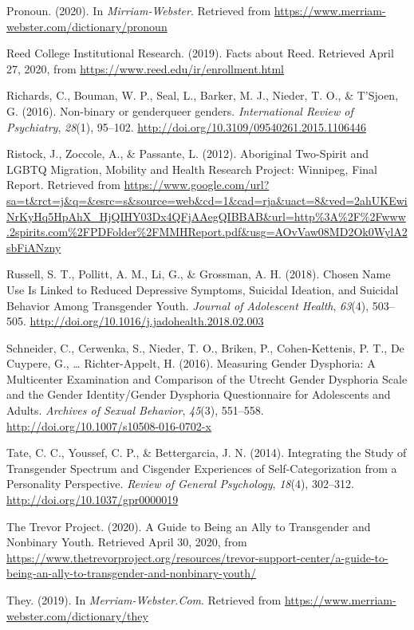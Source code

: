\documentclass[12pt,twoside]{reedthesis}
\newlength{\cslhangindent}
\newenvironment{cslreferences}%
  {\setlength{\parindent}{0pt}%
  \everypar{\setlength{\hangindent}{\cslhangindent}}\ignorespaces}%
  {\par}
\begin{document}
\begin{cslreferences}
\leavevmode\hypertarget{ref-Pronoun2020}{}%
Pronoun. (2020). In \emph{Mirriam-Webster}. Retrieved from \url{https://www.merriam-webster.com/dictionary/pronoun}

\leavevmode\hypertarget{ref-reedcollegeinstitutionalresearchFactsReed2019}{}%
Reed College Institutional Research. (2019). Facts about Reed. Retrieved April 27, 2020, from \url{https://www.reed.edu/ir/enrollment.html}

\leavevmode\hypertarget{ref-richardsNonbinaryGenderqueerGenders2016}{}%
Richards, C., Bouman, W. P., Seal, L., Barker, M. J., Nieder, T. O., \& T'Sjoen, G. (2016). Non-binary or genderqueer genders. \emph{International Review of Psychiatry}, \emph{28}(1), 95--102. \url{http://doi.org/10.3109/09540261.2015.1106446}

\leavevmode\hypertarget{ref-ristockAboriginalTwoSpiritLGBTQ2012}{}%
Ristock, J., Zoccole, A., \& Passante, L. (2012). Aboriginal Two-Spirit and LGBTQ Migration, Mobility and Health Research Project: Winnipeg, Final Report. Retrieved from \url{https://www.google.com/url?sa=t\&rct=j\&q=\&esrc=s\&source=web\&cd=1\&cad=rja\&uact=8\&ved=2ahUKEwiNrKyHq5HpAhX_HjQIHY03Dx4QFjAAegQIBBAB\&url=http\%3A\%2F\%2Fwww.2spirits.com\%2FPDFolder\%2FMMHReport.pdf\&usg=AOvVaw08MD2Ok0WylA2sbFiANzny}

\leavevmode\hypertarget{ref-russellChosenNameUse2018}{}%
Russell, S. T., Pollitt, A. M., Li, G., \& Grossman, A. H. (2018). Chosen Name Use Is Linked to Reduced Depressive Symptoms, Suicidal Ideation, and Suicidal Behavior Among Transgender Youth. \emph{Journal of Adolescent Health}, \emph{63}(4), 503--505. \url{http://doi.org/10.1016/j.jadohealth.2018.02.003}

\leavevmode\hypertarget{ref-schneiderMeasuringGenderDysphoria2016}{}%
Schneider, C., Cerwenka, S., Nieder, T. O., Briken, P., Cohen-Kettenis, P. T., De Cuypere, G., \ldots{} Richter-Appelt, H. (2016). Measuring Gender Dysphoria: A Multicenter Examination and Comparison of the Utrecht Gender Dysphoria Scale and the Gender Identity/Gender Dysphoria Questionnaire for Adolescents and Adults. \emph{Archives of Sexual Behavior}, \emph{45}(3), 551--558. \url{http://doi.org/10.1007/s10508-016-0702-x}

\leavevmode\hypertarget{ref-tateIntegratingStudyTransgender2014}{}%
Tate, C. C., Youssef, C. P., \& Bettergarcia, J. N. (2014). Integrating the Study of Transgender Spectrum and Cisgender Experiences of Self-Categorization from a Personality Perspective. \emph{Review of General Psychology}, \emph{18}(4), 302--312. \url{http://doi.org/10.1037/gpr0000019}

\leavevmode\hypertarget{ref-thetrevorprojectGuideBeingAlly2020}{}%
The Trevor Project. (2020). A Guide to Being an Ally to Transgender and Nonbinary Youth. Retrieved April 30, 2020, from \url{https://www.thetrevorproject.org/resources/trevor-support-center/a-guide-to-being-an-ally-to-transgender-and-nonbinary-youth/}

\leavevmode\hypertarget{ref-They2019}{}%
They. (2019). In \emph{Merriam-Webster.Com}. Retrieved from \url{https://www.merriam-webster.com/dictionary/they}
\end{cslreferences}

\end{document}
